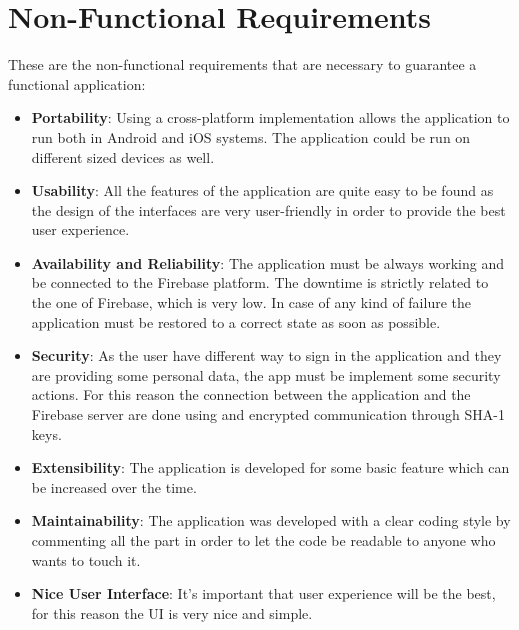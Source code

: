 \section{Non-Functional Requirements}
	These are the non-functional requirements that are necessary to guarantee a functional application:

\begin{itemize}
	\item \textbf{Portability}: Using a cross-platform implementation allows the application to run both in Android and iOS systems. The application could be run on different sized devices as well.
	
	\item \textbf{Usability}: All the features of the application are quite easy to be found as the design of the interfaces are very user-friendly in order to provide the best user experience.
	
	\item \textbf{Availability and Reliability}: The application must be always working and be connected to the Firebase platform.
	The downtime is strictly related to the one of Firebase, which is very low.
	In case of any kind of failure the application must be restored to a correct state as soon as possible.
	
	\item \textbf {Security}: As the user have different way to sign in the application and they are providing some personal data, the app must be implement some security actions. For this reason the connection between the application and the Firebase server are done using and encrypted communication through SHA-1 keys.
	
	\item \textbf{Extensibility}: The application is developed for some basic feature which can be increased over the time.
	
	\item \textbf{Maintainability}: The application was developed with a clear coding style by commenting all the part in order to let the code be readable to anyone who wants to touch it.
	
	\item \textbf{Nice User Interface}: It's important that user experience will be the best, for this reason the UI is very nice and simple.
\end{itemize}
